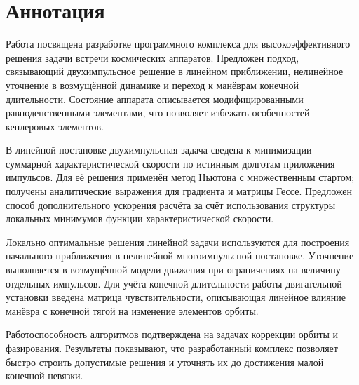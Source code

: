 \section*{Аннотация}

Работа посвящена разработке программного комплекса для высокоэффективного решения задачи встречи космических аппаратов. Предложен подход, связывающий двухимпульсное решение в линейном приближении, нелинейное уточнение в возмущённой динамике и переход к манёврам конечной длительности. Состояние аппарата описывается модифицированными равноденственными элементами, что позволяет избежать особенностей кеплеровых элементов.

В линейной постановке двухимпульсная задача сведена к минимизации суммарной характеристической скорости по истинным долготам приложения импульсов. Для её решения применён метод Ньютона с множественным стартом; получены аналитические выражения для градиента и матрицы Гессе. Предложен способ дополнительного ускорения расчёта за счёт использования структуры локальных минимумов функции характеристической скорости.

Локально оптимальные решения линейной задачи используются для построения начального приближения в нелинейной многоимпульсной постановке. Уточнение выполняется в возмущённой модели движения при ограничениях на величину отдельных импульсов. Для учёта конечной длительности работы двигательной установки введена матрица чувствительности, описывающая линейное влияние манёвра с конечной тягой на изменение элементов орбиты.

Работоспособность алгоритмов подтверждена на задачах коррекции орбиты и фазирования. Результаты показывают, что разработанный комплекс позволяет быстро строить допустимые решения и уточнять их до достижения малой конечной невязки.
